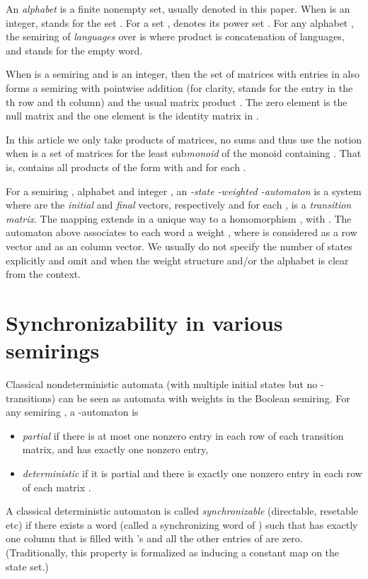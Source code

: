 \documentclass[submission,copyright,creativecommons]{eptcs}
\theoremstyle{plain}
\theoremstyle{definition}
\theoremstyle{remark}
\begin{document}
An \emph{alphabet} is a finite nonempty set, usually denoted  in this paper.
When  is an integer,  stands for the set .
For a set ,  denotes its power set .
For any alphabet , the semiring of \emph{languages} over  is  where
product is concatenation of languages,  and  stands for the empty word.

When  is a semiring and  is an integer, then the set  of  matrices with entries in 
also forms a semiring with pointwise addition  (for clarity,  stands for the entry in the
th row and th column)
and the usual matrix product .
The zero element is the null matrix 
and the one element is the identity matrix  in .

In this article we only take products of matrices, no sums and thus use the notion  when
 is a set of matrices for the least sub\emph{monoid} of the monoid 
containing . That is,  contains all products of the form  with
 and  for each .

For a semiring , alphabet  and integer , an \emph{-state -weighted -automaton}
is a system 
where  are the \emph{initial} and \emph{final} vectors, respectively and for each ,
 is a \emph{transition matrix}. The mapping  extends in a unique way to a homomorphism
,  with . The automaton  above associates to
each word  a weight , where  is considered as a  row vector and  as an
 column vector. We usually do not specify the number  of states explicitly and omit  and  when
the weight structure and/or the alphabet is clear from the context.

\section{Synchronizability in various semirings}

Classical nondeterministic automata (with multiple initial states but no -transitions)
can be seen as automata with weights in the Boolean semiring.
For any semiring , a -automaton  is
\begin{itemize}
\item \emph{partial} if there is at most one nonzero entry in each row of each transition matrix, and  has exactly one nonzero entry,
\item \emph{deterministic} if it is partial and there is exactly one nonzero entry in each row of each matrix .
\end{itemize}
A classical deterministic automaton  is called
\emph{synchronizable} (directable, resetable etc) if there exists a word  (called a synchronizing word of ) such that 
has exactly one column that is filled with 's and all the other entries of  are zero.
(Traditionally, this property is formalized as  inducing a constant map on the state set.)
\end{document}
